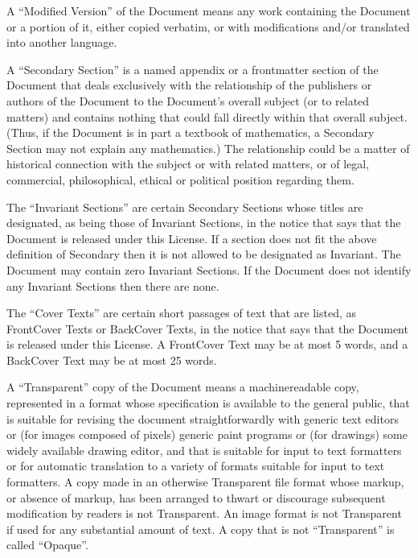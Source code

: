 \documentclass[letterpaper,10pt,english,openany,oneside]{sphinxmanual}
\begin{document}
\sphinxAtStartPar
A “Modified Version” of the Document means any work containing the
Document or a portion of it, either copied verbatim, or with
modifications and/or translated into another language.

\sphinxAtStartPar
A “Secondary Section” is a named appendix or a front\sphinxhyphen{}matter section of
the Document that deals exclusively with the relationship of the
publishers or authors of the Document to the Document’s overall subject
(or to related matters) and contains nothing that could fall directly
within that overall subject. (Thus, if the Document is in part a
textbook of mathematics, a Secondary Section may not explain any
mathematics.) The relationship could be a matter of historical
connection with the subject or with related matters, or of legal,
commercial, philosophical, ethical or political position regarding them.

\sphinxAtStartPar
The “Invariant Sections” are certain Secondary Sections whose titles are
designated, as being those of Invariant Sections, in the notice that
says that the Document is released under this License. If a section does
not fit the above definition of Secondary then it is not allowed to be
designated as Invariant. The Document may contain zero Invariant
Sections. If the Document does not identify any Invariant Sections then
there are none.

\sphinxAtStartPar
The “Cover Texts” are certain short passages of text that are listed, as
Front\sphinxhyphen{}Cover Texts or Back\sphinxhyphen{}Cover Texts, in the notice that says that the
Document is released under this License. A Front\sphinxhyphen{}Cover Text may be at
most 5 words, and a Back\sphinxhyphen{}Cover Text may be at most 25 words.

\sphinxAtStartPar
A “Transparent” copy of the Document means a machine\sphinxhyphen{}readable copy,
represented in a format whose specification is available to the general
public, that is suitable for revising the document straightforwardly
with generic text editors or (for images composed of pixels) generic
paint programs or (for drawings) some widely available drawing editor,
and that is suitable for input to text formatters or for automatic
translation to a variety of formats suitable for input to text
formatters. A copy made in an otherwise Transparent file format whose
markup, or absence of markup, has been arranged to thwart or discourage
subsequent modification by readers is not Transparent. An image format
is not Transparent if used for any substantial amount of text. A copy
that is not “Transparent” is called “Opaque”.
\end{document}
